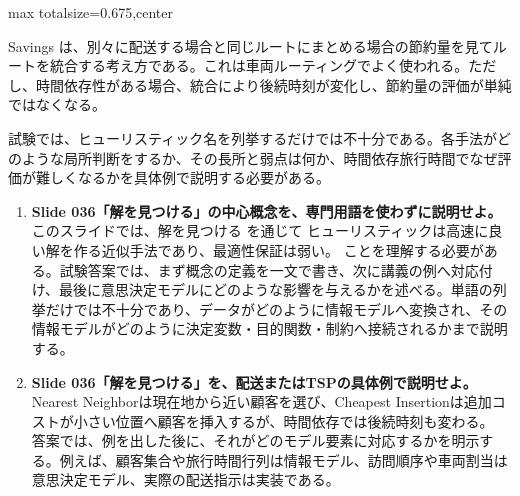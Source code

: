 \begin{adjustbox}{max totalsize={\textwidth}{0.675\textheight},center}
\begin{minipage}{\textwidth}
\begin{minipage}[t]{0.485\textwidth}
Savings は、別々に配送する場合と同じルートにまとめる場合の節約量を見てルートを統合する考え方である。これは車両ルーティングでよく使われる。ただし、時間依存性がある場合、統合により後続時刻が変化し、節約量の評価が単純ではなくなる。\par
試験では、ヒューリスティック名を列挙するだけでは不十分である。各手法がどのような局所判断をするか、その長所と弱点は何か、時間依存旅行時間でなぜ評価が難しくなるかを具体例で説明する必要がある。\par
{}
\begin{enumerate}
\item \textbf{Slide 036「解を見つける」の中心概念を、専門用語を使わずに説明せよ。}\\このスライドでは、解を見つける を通じて ヒューリスティックは高速に良い解を作る近似手法であり、最適性保証は弱い。 ことを理解する必要がある。試験答案では、まず概念の定義を一文で書き、次に講義の例へ対応付け、最後に意思決定モデルにどのような影響を与えるかを述べる。単語の列挙だけでは不十分であり、データがどのように情報モデルへ変換され、その情報モデルがどのように決定変数・目的関数・制約へ接続されるかまで説明する。
\item \textbf{Slide 036「解を見つける」を、配送またはTSPの具体例で説明せよ。}\\Nearest Neighborは現在地から近い顧客を選び、Cheapest Insertionは追加コストが小さい位置へ顧客を挿入するが、時間依存では後続時刻も変わる。 答案では、例を出した後に、それがどのモデル要素に対応するかを明示する。例えば、顧客集合や旅行時間行列は情報モデル、訪問順序や車両割当は意思決定モデル、実際の配送指示は実装である。
\end{enumerate}
\end{minipage}
\end{minipage}
\end{adjustbox}

